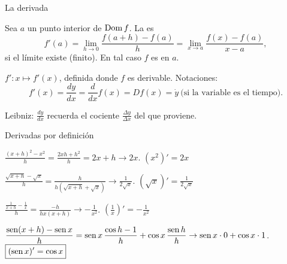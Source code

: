 \documentclass[10pt,aspectratio=169]{beamer}
\begin{document}
\begin{frame}{La derivada}
  \begin{definicion}
    Sea $a$ un punto interior de $\operatorname{Dom} f$. La  es
    \[ f'(a)=\lim_{h\to0}\frac{f(a+h)-f(a)}{h}=\lim_{x\to a}\frac{f(x)-f(a)}{x-a}, \]
    si el límite existe (finito). En tal caso $f$ es  en $a$.
  \end{definicion}
  \begin{definicion}
    $f':x\mapsto f'(x)$, definida donde $f$ es derivable. Notaciones:
    \[ f'(x)=\frac{dy}{dx}=\frac{d}{dx}f(x)=Df(x)=\dot y\ \text{(si la variable es el tiempo)}. \]
  \end{definicion}
  \small Leibniz: $\frac{dy}{dx}$ recuerda el cociente $\frac{\Delta y}{\Delta x}$ del que proviene.
\end{frame}

\begin{frame}{Derivadas por definición}
  \small
  \begin{ejemplo}[1: $x^2$]
    $\displaystyle\frac{(x+h)^2-x^2}{h}=\frac{2xh+h^2}{h}=2x+h\to2x$. \quad $\boxed{(x^2)'=2x}$
  \end{ejemplo}
  \begin{ejemplo}[2: $\sqrt x$, $x>0$]
    $\displaystyle\frac{\sqrt{x+h}-\sqrt x}{h}=\frac{h}{h\left(\sqrt{x+h}+\sqrt x\right)}\to\frac{1}{2\sqrt x}$. \quad $\boxed{(\sqrt x)'=\frac{1}{2\sqrt x}}$
  \end{ejemplo}
  \begin{ejemplo}[3: $\frac1x$]
    $\displaystyle\frac{\frac1{x+h}-\frac1x}{h}=\frac{-h}{hx(x+h)}\to-\frac1{x^2}$. \quad $\boxed{\left(\frac1x\right)'=-\frac{1}{x^2}}$
  \end{ejemplo}
  \begin{ejemplo}[4: $\sen x$]
    $\displaystyle\frac{\operatorname{sen}(x+h)-\operatorname{sen} x}{h}=\operatorname{sen} x\,\frac{\cos h-1}{h}+\cos x\,\frac{\operatorname{sen} h}{h}\to\operatorname{sen} x\cdot0+\cos x\cdot1$. \quad $\boxed{(\operatorname{sen} x)'=\cos x}$
  \end{ejemplo}
\end{frame}
\end{document}
